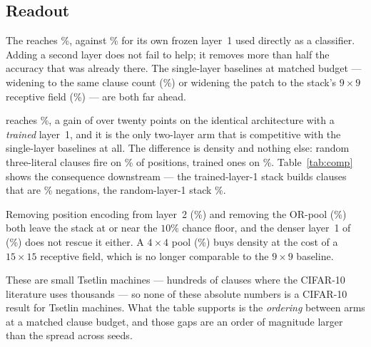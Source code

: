 \subsection{Readout}

 The \mctm reaches
\accMctm{}\%, against \accSingleLOne{}\% for its own frozen layer~1 used directly as a
classifier. Adding a second layer does not fail to help; it removes more than half the
accuracy that was already there. The single-layer baselines at matched budget --- widening
to the same clause count (\accSingleMatched{}\%) or widening the patch to the stack's
$9\times9$ receptive field (\accSingleRf{}\%) --- are both far ahead.

 
reaches \accMctmRandom{}\%, a gain of over twenty points on the identical architecture with a
\emph{trained} layer~1, and it is the only two-layer arm that is competitive with the
single-layer baselines at all. The difference is density and nothing else: random
three-literal clauses fire on \fireMctmRandom{}\% of positions, trained ones on
\fireMctm{}\%. Table~\ref{tab:comp} shows the consequence downstream --- the trained-layer-1
stack builds clauses that are \negMctm{}\% negations, the random-layer-1 stack
\negMctmRandom{}\%.

 Removing position encoding from layer~2
(\accMctmNopos{}\%) and removing the OR-pool (\accMctmNopool{}\%) both leave the stack at or
near the $10\%$ chance floor, and the denser layer~1 of 
(\accMctmDense{}\%) does not rescue it either. A $4\times4$ pool (\accMctmPoolFour{}\%) buys
density at the cost of a $15\times15$ receptive field, which is no longer comparable to the
$9\times9$ baseline.

\begin{ttcallout}
These are small Tsetlin machines --- hundreds of clauses where the CIFAR-10 literature uses
thousands --- so none of these absolute numbers is a CIFAR-10 result for Tsetlin machines.
What the table supports is the \emph{ordering} between arms at a matched clause budget, and
those gaps are an order of magnitude larger than the spread across seeds.
\end{ttcallout}
